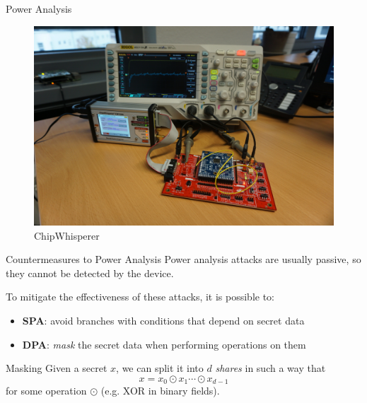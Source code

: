 \begin{frame}{Power Analysis}
    \begin{figure}
        \includegraphics[scale=0.6]{images/chipwhisperer_with_target_and_oscilloscope.jpg}
        \caption{ChipWhisperer}
    \end{figure}
    
\end{frame}

\begin{frame}{Countermeasures to Power Analysis}
    Power analysis attacks are usually passive, so they cannot be detected by the device.
    \begin{block}{}
        To mitigate the effectiveness of these attacks, it is possible to:
        \begin{itemize}
            \item \textbf{SPA}: avoid branches with conditions that depend on secret data
            \item \textbf{DPA}: \textit{mask} the secret data when performing operations on them
        \end{itemize}
    \end{block}
    \begin{block}{Masking}
        Given a secret $x$, we can split it into $d$ \textit{shares} in such a way that
        \begin{equation*}
            x = x_0 \odot x_1 \cdots \odot x_{d-1}
        \end{equation*}
        for some operation $\odot$ (e.g. XOR in binary fields).
    \end{block}
\end{frame}

